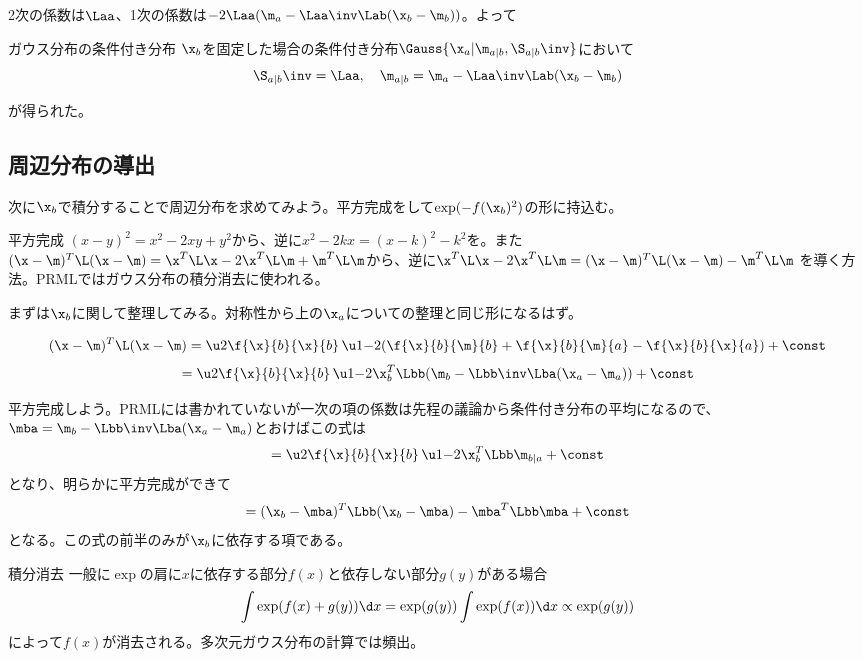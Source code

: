 \documentclass[a4paper]{jsarticle}
\begin{document}
2次の係数は$\Laa$、1次の係数は$-2 \Laa (\m_a - \Laa\inv\Lab(\x_b - \m_b))$。よって
\begin{itembox}[l]{ガウス分布の条件付き分布}
$\x_b$を固定した場合の条件付き分布$\Gauss{\x_a | \m_{a|b}, \S_{a|b}\inv}$において
\[ \S_{a|b}\inv = \Laa, \quad \m_{a|b} = \m_a - \Laa\inv\Lab(\x_b - \m_b) \]
\end{itembox}
が得られた。

\subsection{周辺分布の導出}
次に$\x_b$で積分することで周辺分布を求めてみよう。平方完成をして$\exp(-f(\x_b)^2)$の形に持込む。

\begin{itembox}[l]{平方完成}
$ (x - y)^2 = x^2 -2xy + y^2 $から、逆に$ x^2 - 2kx = (x - k)^2 - k^2 $を。また
$ (\x - \m)^T \L (\x - \m) = \x^T \L \x -2 \x^T \L \m + \m^T \L \m $から、逆に$
\x^T \L \x -2 \x^T \L \m = (\x - \m)^T \L (\x - \m) - \m^T \L \m$
を導く方法。PRMLではガウス分布の積分消去に使われる。
\end{itembox}

まずは$\x_b$に関して整理してみる。対称性から上の$\x_a$についての整理と同じ形になるはず。

\[ (\x - \m)^T \L (\x - \m) = \u2{\f{\x}{b}{\x}{b}} \, 
\u1{ -2 (\f{\x}{b}{\m}{b} + \f{\x}{b}{\m}{a} - \f{\x}{b}{\x}{a})} + \const\]
\[  = \u2{\f{\x}{b}{\x}{b}} \, \u1{ -2 \x_b^T \Lbb (\m_b - \Lbb\inv\Lba(\x_a - \m_a))} + \const\]

平方完成しよう。PRMLには書かれていないが一次の項の係数は先程の議論から条件付き分布の平均になるので、
$\mba = \m_b - \Lbb\inv\Lba(\x_a - \m_a)$とおけばこの式は
\[  = \u2{\f{\x}{b}{\x}{b}} \, \u1{ -2 \x_b^T \Lbb \m_{b|a}} + \const\]
となり、明らかに平方完成ができて
\[  = (\x_b - \mba)^T \Lbb (\x_b - \mba) - \mba^T \Lbb \mba + \const\]
となる。この式の前半のみが$\x_b$に依存する項である。

\begin{itembox}[l]{積分消去}
一般に$\exp$の肩に$x$に依存する部分$f(x)$と依存しない部分$g(y)$がある場合
\[ \int \exp(f(x) + g(y)) \d x = \exp(g(y)) \int \exp(f(x)) \d x \propto \exp(g(y)) \]
によって$f(x)$が消去される。多次元ガウス分布の計算では頻出。
\end{itembox}
\end{document}
